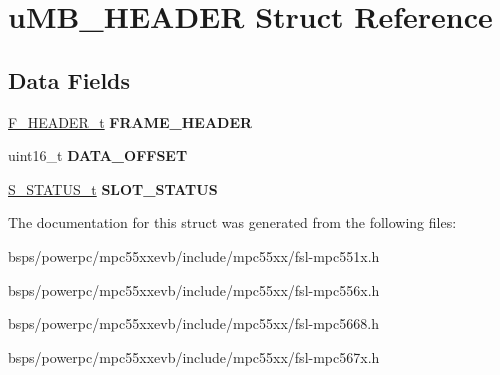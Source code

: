 \hypertarget{structuMB__HEADER}{}\section{u\+M\+B\+\_\+\+H\+E\+A\+D\+ER Struct Reference}
\label{structuMB__HEADER}
\subsection*{Data Fields}
\begin{DoxyCompactItemize}
\item 
\mbox{\label{structuMB__HEADER_ae264b68066511aa01e0cfc18e7dae5c3}} 
\mbox{\hyperlink{unionuF__HEADER}{F\+\_\+\+H\+E\+A\+D\+E\+R\+\_\+t}} {\bfseries F\+R\+A\+M\+E\+\_\+\+H\+E\+A\+D\+ER}
\item 
\mbox{\label{structuMB__HEADER_a5ed898b14e38fb42ead70bbc4eaee842}} 
uint16\+\_\+t {\bfseries D\+A\+T\+A\+\_\+\+O\+F\+F\+S\+ET}
\item 
\mbox{\label{structuMB__HEADER_a7a305171090637a421219c5f745fd3d5}} 
\mbox{\hyperlink{unionuS__STSTUS}{S\+\_\+\+S\+T\+A\+T\+U\+S\+\_\+t}} {\bfseries S\+L\+O\+T\+\_\+\+S\+T\+A\+T\+US}
\end{DoxyCompactItemize}


The documentation for this struct was generated from the following files\+:\begin{DoxyCompactItemize}
\item 
bsps/powerpc/mpc55xxevb/include/mpc55xx/fsl-\/mpc551x.\+h\item 
bsps/powerpc/mpc55xxevb/include/mpc55xx/fsl-\/mpc556x.\+h\item 
bsps/powerpc/mpc55xxevb/include/mpc55xx/fsl-\/mpc5668.\+h\item 
bsps/powerpc/mpc55xxevb/include/mpc55xx/fsl-\/mpc567x.\+h\end{DoxyCompactItemize}
